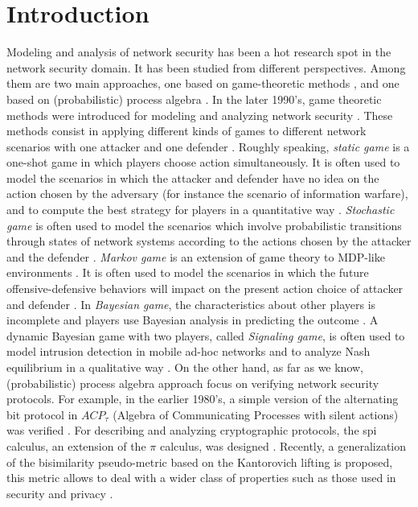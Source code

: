 \documentclass{acm_proc_article-sp}
\begin{document}
\section{Introduction}
Modeling and analysis of network security has been a hot research spot in the network security domain.
It has been studied from different perspectives.  Among them are two main approaches, one based on game-theoretic methods \cite{martin},  and
one based on (probabilistic) process algebra \cite{robin,rob,yuxin}.
In the later 1990's, game theoretic methods were introduced for modeling and analyzing network security \cite{syverson}.
These methods consist in applying different kinds of games to different network scenarios with one attacker and one defender \cite{sankardas}.
Roughly speaking,
{\it static game} is a one-shot game in which players choose action simultaneously.
It is often used to model the scenarios in which the attacker and defender have no idea on the action chosen by the adversary (for instance the scenario of information warfare),
and to compute the best strategy for players in a quantitative way \cite{jormakka}.
{\it Stochastic game} is often used to model the scenarios which involve probabilistic transitions through states of network systems according to the actions chosen by the attacker and the defender \cite{nguyen,klye}.
{\it Markov game} is an extension of game theory to MDP-like environments \cite{vander}.
It is often used to model the scenarios in which the future offensive-defensive behaviors will impact on the present action choice of attacker and defender \cite{xiaolin}.
In {\it Bayesian game}, the characteristics about other players is incomplete and players use Bayesian analysis in predicting the outcome \cite{Harsanyi}.
A dynamic Bayesian game with two players, called {\it Signaling game}, is often used to model intrusion detection in mobile ad-hoc networks and to analyze Nash equilibrium in a qualitative way \cite{patcha}.
On the other hand, as far as we know, (probabilistic) process algebra approach focus on verifying network security protocols.
For example, in the earlier 1980's, a simple version of the alternating bit protocol
in $ACP_\tau$ (Algebra of Communicating Processes with silent actions) was verified \cite{bergstra}.
For describing and analyzing cryptographic protocols, the spi calculus, an extension of the $\pi$ calculus, was designed \cite{abadi}.
Recently, a generalization of the bisimilarity pseudo-metric based on the Kantorovich lifting is proposed,
this metric allows to deal with a wider class of properties such as those used in security and privacy \cite{lilixu}.
\end{document}
